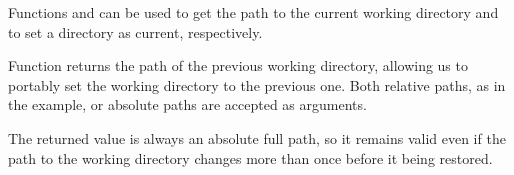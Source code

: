 \documentclass[krantz2]{krantz}\usepackage{knitr}%
\begin{document}
Functions  and  can be used to get the path to the current working directory and to set a directory as current, respectively.
\begin{knitrout}\footnotesize
{}\color{fgcolor}\begin{kframe}
\begin{alltt}
\hlstd{()}
\end{alltt}
\end{kframe}
\end{knitrout}

Function  returns the path of the previous working directory, allowing us to portably set the working directory to the previous one. Both relative paths, as in the example, or absolute paths are accepted as arguments.
\begin{knitrout}\footnotesize
{}\color{fgcolor}\begin{kframe}
\begin{alltt}
 \hlkwb{<-} \hlstd{(}\hlstd{)}
\hlstd{()}
\end{alltt}
\end{kframe}
\end{knitrout}

The returned value is always an absolute full path, so it remains valid even if the path to the working directory changes more than once before it being restored.
\begin{knitrout}\footnotesize
{}\color{fgcolor}\begin{kframe}
\begin{alltt}
\hlstd{()}
\end{alltt}
\end{kframe}
\end{knitrout}
\end{document}
